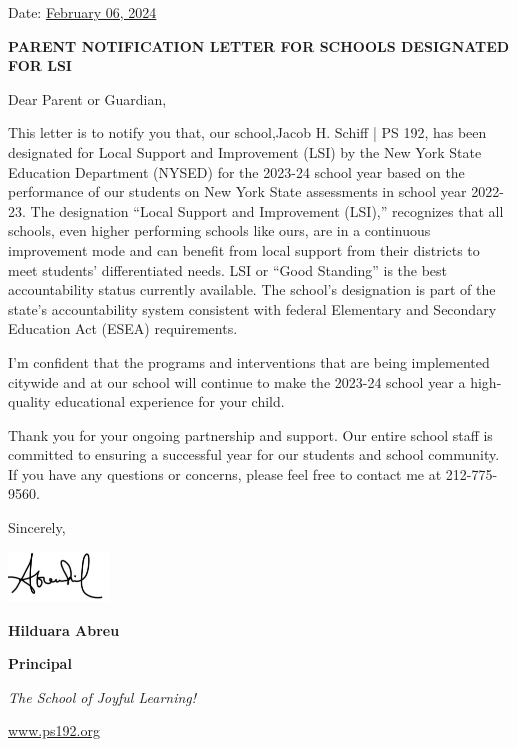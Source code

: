 \documentclass[12pt,letterpaper]{article}
\begin{document}
\vspace*{0.5in}
Date: \href{https://www.ps192.org/apps/bbmessages/show_bbm.jsp?REC_ID=139439}{February 06, 2024}

\textbf{PARENT NOTIFICATION LETTER FOR SCHOOLS DESIGNATED FOR LSI}

Dear Parent or Guardian,

This letter is to notify you that, our school,Jacob H. Schiff | PS 192, has been designated for Local Support and Improvement (LSI) by the New York State Education Department (NYSED) for the 2023-24 school year based on the performance of our students on New York State assessments in school year 2022-23. The designation “Local Support and Improvement (LSI),” recognizes that all schools, even higher performing schools like ours, are in a continuous improvement mode and can benefit from local support from their districts to meet students’ differentiated needs. LSI or ``Good Standing'' is the best accountability status currently available. The school’s designation is part of the state’s accountability system consistent with federal Elementary and Secondary Education Act (ESEA) requirements.

I’m confident that the programs and interventions that are being implemented citywide and at our school will continue to make the 2023-24 school year a high-quality educational experience for your child.

Thank you for your ongoing partnership and support. Our entire school staff is committed to ensuring a successful year for our students and school community. If you have any questions or concerns, please feel free to contact me at 212-775-9560.

Sincerely,

\includegraphics[width=0.2\textwidth]{hil_signature}

\textbf{Hilduara Abreu}

\textbf{Principal}

\textit{The School of Joyful Learning!}

\url{www.ps192.org}
\end{document}

